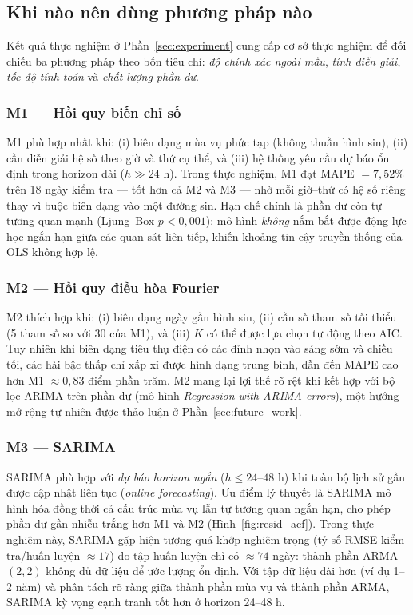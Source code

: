\documentclass[12pt, a4paper]{article}
\theoremstyle{definition}
\begin{document}
\subsection{Khi nào nên dùng phương pháp nào}
\label{sec:when_to_use}

Kết quả thực nghiệm ở Phần~\ref{sec:experiment} cung cấp cơ sở thực nghiệm
để đối chiếu ba phương pháp theo bốn tiêu chí: \emph{độ chính xác ngoài mẫu},
\emph{tính diễn giải}, \emph{tốc độ tính toán} và \emph{chất lượng phần dư}.

\subsubsection*{M1 — Hồi quy biến chỉ số}

M1 phù hợp nhất khi: (i) biên dạng mùa vụ phức tạp (không thuần hình sin),
(ii) cần diễn giải hệ số theo giờ và thứ cụ thể, và (iii) hệ thống yêu cầu
dự báo ổn định trong horizon dài ($h \gg 24$ h). Trong thực nghiệm, M1 đạt
MAPE $= 7{,}52\%$ trên 18 ngày kiểm tra --- tốt hơn cả M2 và M3 --- nhờ
mỗi giờ--thứ có hệ số riêng thay vì buộc biên dạng vào một đường sin.
Hạn chế chính là phần dư còn tự tương quan mạnh (Ljung--Box $p < 0{,}001$):
mô hình \emph{không} nắm bắt được động lực học ngắn hạn giữa các quan sát
liên tiếp, khiến khoảng tin cậy truyền thống của OLS không hợp lệ.

\subsubsection*{M2 — Hồi quy điều hòa Fourier}

M2 thích hợp khi: (i) biên dạng ngày gần hình sin, (ii) cần số tham số tối
thiểu (5 tham số so với 30 của M1), và (iii) $K$ có thể được lựa chọn tự
động theo AIC. Tuy nhiên khi biên dạng tiêu thụ điện có các đỉnh nhọn vào
sáng sớm và chiều tối, các hài bậc thấp chỉ xấp xỉ được hình dạng trung bình,
dẫn đến MAPE cao hơn M1 $\approx 0{,}83$ điểm phần trăm. M2 mang lại lợi
thế rõ rệt khi kết hợp với bộ lọc ARIMA trên phần dư (mô hình \emph{Regression
with ARIMA errors}), một hướng mở rộng tự nhiên được thảo luận ở
Phần~\ref{sec:future_work}.

\subsubsection*{M3 — SARIMA}

SARIMA phù hợp với \emph{dự báo horizon ngắn} ($h \leq 24\text{--}48$ h)
khi toàn bộ lịch sử gần được cập nhật liên tục (\emph{online forecasting}).
Ưu điểm lý thuyết là SARIMA mô hình hóa đồng thời cả cấu trúc mùa vụ lẫn
tự tương quan ngắn hạn, cho phép phần dư gần nhiễu trắng hơn M1 và M2
(Hình~\ref{fig:resid_acf}). Trong thực nghiệm này, SARIMA gặp hiện tượng
quá khớp nghiêm trọng (tỷ số RMSE kiểm tra/huấn luyện $\approx 17$) do
tập huấn luyện chỉ có $\approx 74$ ngày: thành phần ARMA$(2,2)$ không đủ
dữ liệu để ước lượng ổn định. Với tập dữ liệu dài hơn (ví dụ 1--2 năm) và
phân tách rõ ràng giữa thành phần mùa vụ và thành phần ARMA, SARIMA kỳ
vọng cạnh tranh tốt hơn ở horizon 24--48 h.
\end{document}
